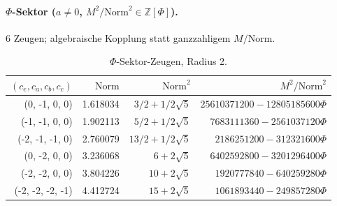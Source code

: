 \paragraph{$\Phi$-Sektor ($a\neq 0$, $M^2/\mathrm{Norm}^2\in\mathbb{Z}[\Phi]$).}
6 Zeugen; algebraische Kopplung statt ganzzahligem $M/\mathrm{Norm}$.

\begin{table}[ht]
  \centering
  \caption{$\Phi$-Sektor-Zeugen, Radius 2.}
  \label{tab:eabc-phi-r2}
  \begin{tabular}{rrrr}
    \toprule
    $(c_e,c_a,c_b,c_c)$ & $\mathrm{Norm}$ & $\mathrm{Norm}^2$ & $M^2/\mathrm{Norm}^2$ \\
    \midrule
    (0, -1, 0, 0) & 1.618034 & $3/2 + 1/2\sqrt{5}$ & $25610371200 - 12805185600\Phi$ \\
    (-1, -1, 0, 0) & 1.902113 & $5/2 + 1/2\sqrt{5}$ & $7683111360 - 2561037120\Phi$ \\
    (-2, -1, -1, 0) & 2.760079 & $13/2 + 1/2\sqrt{5}$ & $2186251200 - 312321600\Phi$ \\
    (0, -2, 0, 0) & 3.236068 & $6 + 2\sqrt{5}$ & $6402592800 - 3201296400\Phi$ \\
    (-2, -2, 0, 0) & 3.804226 & $10 + 2\sqrt{5}$ & $1920777840 - 640259280\Phi$ \\
    (-2, -2, -2, -1) & 4.412724 & $15 + 2\sqrt{5}$ & $1061893440 - 249857280\Phi$ \\
    \bottomrule
  \end{tabular}
\end{table}
